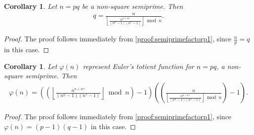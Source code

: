 \documentclass[11pt,reqno]{article}
\theoremstyle{plain}
\newtheorem{corollary}[theorem]{Corollary}
\theoremstyle{definition}
\newcommand{\floor}[1]{\left\lfloor #1 \right\rfloor}
\begin{document}
\begin{corollary} \label{proof:semiprimefactorp2}
Let $n=pq$ be a non-square semiprime. Then
\begin{align*}
q = \frac{n}{\floor{\frac{n^{n+n\gamma}}{(n^n-1)(n^{\gamma}-1)}}\bmod n}.
\end{align*}
\end{corollary}
\begin{proof}
The proof follows immediately from \cref{proof:semiprimefactorp1}, since $\frac{n}{p} = q$ in this case.
\end{proof}
\begin{corollary} \label{proof:semiprimetotient}
Let $\varphi(n)$ represent Euler's totient function for $n=pq$, a non-square semiprime. Then
\begin{align*}
\varphi(n) = \left(\left( \floor{\frac{n^{n+n\gamma}}{(n^n-1)(n^{\gamma}-1)}}\bmod n \right) - 1 \right) \left( \left( \frac{n}{\floor{\frac{n^{n+n\gamma}}{(n^n-1)(n^{\gamma}-1)}}\bmod n} \right) - 1 \right).
\end{align*}
\end{corollary}
\begin{proof}
The proof follows immediately from \cref{proof:semiprimefactorp1}, since $\varphi(n) = (p - 1)(q - 1)$ in this case.
\end{proof}

\begingroup
\raggedright


\endgroup
\end{document}
